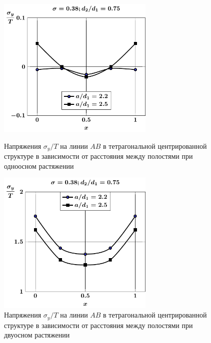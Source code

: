 \begin{figure}[h!]
\centering\footnotesize
\parbox[b]{7.5cm}{\centering\includegraphics[width=7.5cm]{cav9-a-d75-t1-sig_y.pdf}
\caption{Напряжения $\sigma_y/T$ на линии $AB$ в тетрагональной центрированной структуре в зависимости от расстояния между полостями при одноосном растяжении 
\label{f:9:38}}}\hfil\hfil
\parbox[b]{7.5cm}{\centering\includegraphics[width=7.5cm]{cav9-a-d75-t2-sig_y.pdf}
\caption{Напряжения $\sigma_y/T$ на линии $AB$ в тетрагональной центрированной структуре в зависимости от расстояния между полостями при двуосном растяжении
\label{f:9:39}}}
\end{figure}

